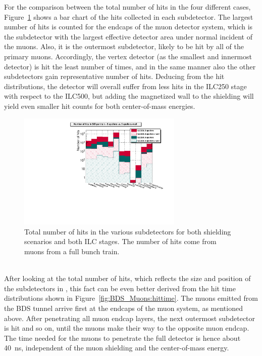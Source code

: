 For the comparison between the total number of hits in the four different cases, Figure~\ref{fig:BDS_Muons:hits} shows a bar chart of the hits collected in each subdetector.
The largest number of hits is counted for the endcaps of the muon detector system, which is the subdetector with the largest effective detector area under normal incident of the muons.
Also, it is the outermost subdetector, likely to be hit by all of the primary muons.
Accordingly, the vertex detector (as the smallest and innermost detector) is hit the least number of times, and in the same manner also the other subdetectors gain representative number of hits.
Deducing from the hit distributions, the \sid detector will overall suffer from less hits in the ILC250 stage with respect to the ILC500, but adding the magnetized wall to the shielding will yield even smaller hit counts for both center-of-mass energies.
\begin{figure}[h]
\centering
\includegraphics[width=0.7\textwidth]{Figures/BDS_muons/Hits_in_SiD_subdetectors_MuonSpoilerStudy.pdf}
\caption[Number of muon hits in the \sid subdetectors]{Total number of hits in the various \sid subdetectors for both shielding scenarios and both ILC stages.
The number of hits come from muons from a full bunch train.}
\label{fig:BDS_Muons:hits}
\end{figure}
\\After looking at the total number of hits, which reflects the size and position of the subdetectors in \sid, this fact can be even better derived from the hit time distributions shown in Figure~\ref{fig:BDS_Muons:hittime}.
The muons emitted from the BDS tunnel arrive first at the endcaps of the muon system, as mentioned above.
After penetrating all muon endcap layers, the next outermost subdetector is hit and so on, until the muons make their way to the opposite muon endcap.
The time needed for the muons to penetrate the full detector is hence about \SI{40}{\nano\second}, independent of the muon shielding and the center-of-mass energy.
